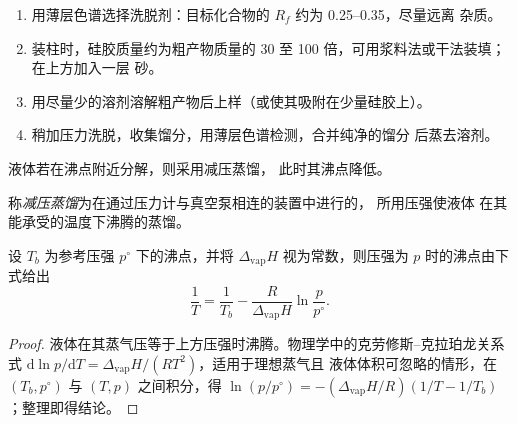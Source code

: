 \begin{method}[快速柱色谱操作]\label{met:b2:lab-techniques-2:flash}
\begin{enumerate}
  \item 用薄层色谱选择洗脱剂：目标化合物的 $R_f$ 约为 0.25--0.35，尽量远离
        杂质。
  \item 装柱时，硅胶质量约为粗产物质量的 30 至 100 倍，可用浆料法或干法装填；在上方加入一层
        砂。
  \item 用尽量少的溶剂溶解粗产物后上样（或使其吸附在少量硅胶上）。
  \item 稍加压力洗脱，收集馏分，用薄层色谱检测，合并纯净的馏分
        后蒸去溶剂。
\end{enumerate}
\end{method}

液体若在沸点附近分解，则采用减压蒸馏，
此时其沸点降低。

\begin{definition}[减压蒸馏]\label{def:b2:lab-techniques-2:reduced-pressure}
称\emph{减压蒸馏}为在通过压力计与真空泵相连的装置中进行的，
所用压强使液体
在其能承受的温度下沸腾的蒸馏。
\end{definition}

\begin{proposition}[减压下的沸腾]\label{prop:b2:lab-techniques-2:reduced-pressure}
设 $T_b$ 为参考压强 $p^\circ$ 下的沸点，并将 $\Delta_{\mathrm{vap}}H$
视为常数，则压强为 $p$ 时的沸点由下式给出
\begin{equation*}
\frac{1}{T} = \frac{1}{T_b} - \frac{R}{\Delta_{\mathrm{vap}}H}\ln\frac{p}{p^\circ}.
\end{equation*}
\end{proposition}

\begin{proof}
液体在其蒸气压等于上方压强时沸腾。物理学中的克劳修斯–克拉珀龙关系式
$\mathrm d\ln p/\mathrm dT = \Delta_{\mathrm{vap}}H/(RT^2)$，适用于理想蒸气且
液体体积可忽略的情形，在 $(T_b, p^\circ)$ 与 $(T, p)$ 之间积分，得 $\ln(p/p^\circ) =
-(\Delta_{\mathrm{vap}}H/R)(1/T - 1/T_b)$；整理即得结论。
\end{proof}

